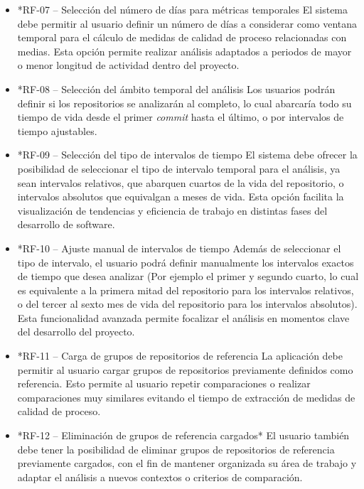 \begin{itemize}
    \item*{RF-07 – Selección del número de días para métricas temporales}
    El sistema debe permitir al usuario definir un número de días a considerar como ventana temporal para el cálculo de medidas de calidad de proceso relacionadas con medias. Esta opción permite realizar análisis adaptados a periodos de mayor o menor longitud de actividad dentro del proyecto.
    
    \item*{RF-08 – Selección del ámbito temporal del análisis}
    Los usuarios podrán definir si los repositorios se analizarán al completo, lo cual abarcaría todo su tiempo de vida desde el primer \textit{commit} hasta el último, o por intervalos de tiempo ajustables.
    
    \item*{RF-09 – Selección del tipo de intervalos de tiempo}
    El sistema debe ofrecer la posibilidad de seleccionar el tipo de intervalo temporal para el análisis, ya sean intervalos relativos, que abarquen cuartos de la vida del repositorio, o intervalos absolutos que equivalgan a meses de vida. Esta opción facilita la visualización de tendencias y eficiencia de trabajo en distintas fases del desarrollo de software.
    
    \item*{RF-10 – Ajuste manual de intervalos de tiempo}
    Además de seleccionar el tipo de intervalo, el usuario podrá definir manualmente los intervalos exactos de tiempo que desea analizar (Por ejemplo el primer y segundo cuarto, lo cual es equivalente a la primera mitad del repositorio para los intervalos relativos, o del tercer al sexto mes de vida del repositorio para los intervalos absolutos). Esta funcionalidad avanzada permite focalizar el análisis en momentos clave del desarrollo del proyecto.
    
    \item*{RF-11 – Carga de grupos de repositorios de referencia}
    La aplicación debe permitir al usuario cargar grupos de repositorios previamente definidos como referencia. Esto permite al usuario repetir comparaciones o realizar comparaciones muy similares evitando el tiempo de extracción de medidas de calidad de proceso.
    
    \item*{RF-12 – Eliminación de grupos de referencia cargados*}
    El usuario también debe tener la posibilidad de eliminar grupos de repositorios de referencia previamente cargados, con el fin de mantener organizada su área de trabajo y adaptar el análisis a nuevos contextos o criterios de comparación.
    

\end{itemize}

